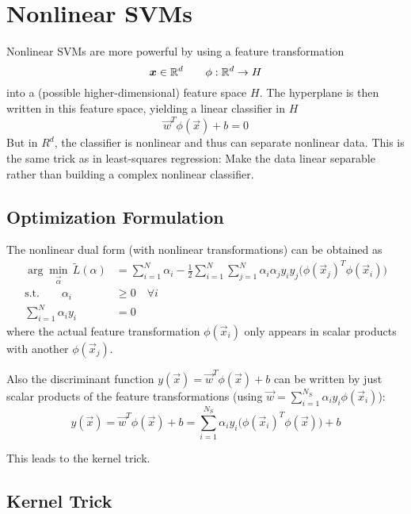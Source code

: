 	\section{Nonlinear SVMs}
		Nonlinear SVMs are more powerful by using a feature transformation
		\begin{equation}
			\bm{x} \in \mathbb{R}^d \qquad \phi : \mathbb{R}^d \rightarrow H
		\end{equation}
		into a (possible higher-dimensional) feature space \(H\). The hyperplane is then written in this feature space, yielding a linear classifier in \(H\)
		\begin{equation}
			\vec{w}^T \phi(\vec{x}) + b = 0
		\end{equation}
		But in \(R^d\), the classifier is nonlinear and thus can separate nonlinear data. This is the same trick as in least-squares regression: Make the data linear separable rather than building a complex nonlinear classifier.

		\subsection{Optimization Formulation}
			The nonlinear dual form (with nonlinear transformations) can be obtained as
			\begin{align}
				\arg\min_{ \vec{\alpha} } \, \tilde{L}(\alpha) &= \sum_{i = 1}^{N} \alpha_i - \frac{1}{2} \sum_{i = 1}^{N} \sum_{j = 1}^{N} \alpha_i \alpha_j y_i y_j \big(\phi(\vec{x}_j)^T \phi(\vec{x}_i)\big) \\
				\textrm{s.t.} \qquad
				\alpha_i &\geq 0 \quad\forall i \\
				\sum_{i = 1}^{N} \alpha_i y_i &= 0
			\end{align}
			where the actual feature transformation \( \phi(\vec{x}_i) \) only appears in scalar products with another \( \phi(\vec{x}_j) \).
			
			Also the discriminant function \( y(\vec{x}) = \vec{w}^T \phi(\vec{x}) + b \) can be written by just scalar products of the feature transformations (using \( \vec{w} = \sum_{i = 1}^{N_S} \alpha_i y_i \phi(\vec{x}_i) \)):
			\begin{equation}
				y(\vec{x}) = \vec{w}^T \phi(\vec{x}) + b = \sum_{i = 1}^{N_S} \alpha_i y_i \big(\phi(\vec{x}_i)^T \phi(\vec{x})\big) + b
			\end{equation}
			
			This leads to the kernel trick.

		\subsection{Kernel Trick}
			\label{sec:svmKernelTrick}
		
